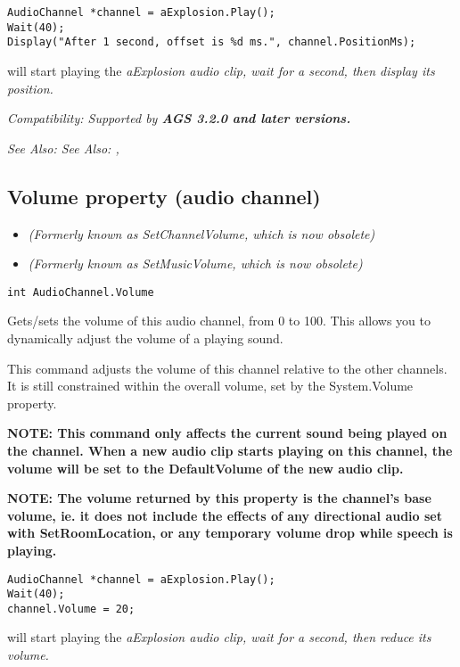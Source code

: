 \begin{verbatim}
AudioChannel *channel = aExplosion.Play();
Wait(40);
Display("After 1 second, offset is %d ms.", channel.PositionMs);
\end{verbatim}
will start playing the \it{aExplosion} audio clip, wait for a second, then display its position.

\it{Compatibility:} Supported by \bf{AGS 3.2.0} and later versions.

\it{See Also:} \it{See Also:} ,


\subsection{Volume property (audio channel)}\label{AudioChannel.Volume}%

\begin{itemize}
\item \it{(Formerly known as SetChannelVolume, which is now obsolete)}
\item \it{(Formerly known as SetMusicVolume, which is now obsolete)}
\end{itemize}

\begin{verbatim}
int AudioChannel.Volume
\end{verbatim}
Gets/sets the volume of this audio channel, from 0 to 100. This allows you to dynamically
adjust the volume of a playing sound.

This command adjusts the volume of this channel relative to the other channels.
It is still constrained within the overall volume, set by the System.Volume property.

\bf{NOTE:} This command only affects the current sound being played on the channel.
When a new audio clip starts playing on this channel, the volume will be set to the
DefaultVolume of the new audio clip.

\bf{NOTE:} The volume returned by this property is the channel's base volume, ie. it does
not include the effects of any directional audio set with SetRoomLocation, or any temporary
volume drop while speech is playing.

\begin{verbatim}
AudioChannel *channel = aExplosion.Play();
Wait(40);
channel.Volume = 20;
\end{verbatim}
will start playing the \it{aExplosion} audio clip, wait for a second, then reduce its volume.


